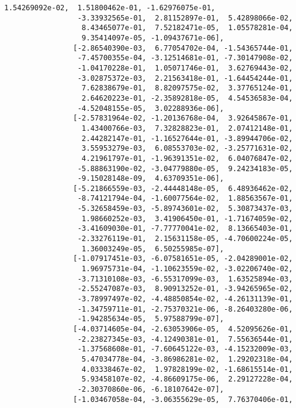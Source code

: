 \documentclass[11pt]{article}
\begin{document}
\begin{Verbatim}[commandchars=\\\{\}]
                  1.54269092e-02,  1.51800462e-01, -1.62976075e-01,
                 -3.33932565e-01,  2.81152897e-01,  5.42898066e-02,
                  8.43465077e-01,  7.52182471e-05,  1.05578281e-04,
                  9.35414097e-05, -1.09437671e-06],
                [-2.86540390e-03,  6.77054702e-04, -1.54365744e-01,
                 -7.45700355e-04, -3.12514681e-01, -7.30147908e-02,
                 -1.04170228e-01,  1.05071746e-01,  3.62769443e-02,
                 -3.02875372e-03,  2.21563418e-01, -1.64454244e-01,
                  7.62838679e-01,  8.82097575e-02,  3.37765124e-01,
                  2.64620223e-01, -2.35892818e-05,  4.54536583e-04,
                 -4.52048155e-05,  3.02288936e-06],
                [-2.57831964e-02, -1.20136768e-04,  3.92645867e-01,
                  1.43400766e-03,  7.32828823e-01,  2.07412148e-01,
                  2.44282147e-01, -1.16527644e-01, -3.89944706e-02,
                  3.55953279e-03,  6.08553703e-02, -3.25771631e-02,
                  4.21961797e-01, -1.96391351e-02,  6.04076847e-02,
                 -5.88863190e-02, -3.04779880e-05,  9.24234183e-05,
                 -9.15028148e-09,  4.63709351e-06],
                [-5.21866559e-03, -2.44448148e-05,  6.48936462e-02,
                 -8.74121794e-04, -1.60077564e-02,  1.88563567e-01,
                 -5.32658459e-03, -5.89743601e-02,  5.30873437e-03,
                  1.98660252e-03,  3.41906450e-01, -1.71674059e-02,
                 -3.41609030e-01, -7.77770041e-02,  8.13665403e-01,
                 -2.33276119e-01,  2.15631158e-05, -4.70600224e-05,
                  1.36003249e-05,  6.50255985e-07],
                [-1.07917451e-03, -6.07581651e-05, -2.04289001e-02,
                  1.96975731e-04, -1.10623559e-02, -3.02206740e-02,
                 -3.71310108e-03, -6.55317099e-03,  1.63525894e-03,
                 -2.55247087e-03,  8.90913252e-01, -3.94265965e-02,
                 -3.78997497e-02, -4.48850854e-02, -4.26131139e-01,
                 -1.34759711e-01, -2.75370321e-06, -8.26403280e-06,
                 -1.94285634e-05,  5.97588799e-07],
                [-4.03714605e-04, -2.63053906e-05,  4.52095626e-01,
                 -2.23827345e-03, -4.12490381e-01,  7.55636544e-01,
                 -1.37568608e-01, -7.60645122e-03, -4.15232009e-03,
                  5.47034778e-04, -3.86986281e-02,  1.29202318e-04,
                  4.03338467e-02,  1.97828199e-02, -1.68615514e-01,
                  5.93458107e-02, -4.86609175e-06,  2.29127228e-04,
                 -2.30370860e-06, -6.18107642e-07],
                [-1.03467058e-04, -3.06355629e-05,  7.76370406e-01,

\end{Verbatim}
\end{document}

